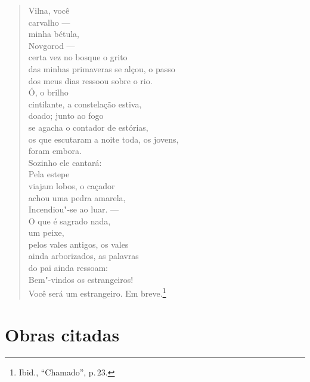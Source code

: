 %
\begin{verse}
Vilna, você\\
carvalho ---\\
minha bétula,\\
Novgorod ---\\
certa vez no bosque o grito\\
das minhas primaveras se alçou, o passo\\
dos meus dias ressoou sobre o rio.\\[10pt]
Ó, o brilho\\
cintilante, a constelação estiva,\\
doado; junto ao fogo\\
se agacha o contador de estórias,\\
os que escutaram a noite toda, os jovens,\\
foram embora.\\[10pt]
Sozinho ele cantará:\\
Pela estepe\\
viajam lobos, o caçador\\
achou uma pedra amarela,\\
Incendiou"-se ao luar. ---\\[10pt]
O que é sagrado nada,\\
um peixe,\\
pelos vales antigos, os vales\\
ainda arborizados, as palavras\\
do pai ainda ressoam:\\
Bem"-vindos os estrangeiros!\\
Você será um estrangeiro. Em breve.\footnote{Ibid., ``Chamado'', p.\,23.}
\end{verse}

\chapter{Obras citadas}

